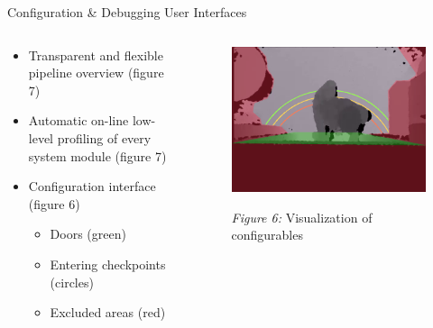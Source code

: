 \documentclass[final,hyperref={pdfpagelabels=false}]{beamer}
\begin{document}
\begin{frame}[t]
\begin{columns}[t]
\begin{column}{.465\textwidth}

\begin{block}{
\vspace*{-0.002\textheight}
Configuration \& Debugging User Interfaces
}

\begin{columns} %
\begin{column}{.54\textwidth} %

\begin{itemize}
\item Transparent and flexible pipeline overview (figure 7)
\item Automatic on-line low-level profiling of every system module (figure 7)
\item Configuration interface (figure 6)

\begin{itemize}
\item Doors (green)
\item Entering checkpoints (circles)
\item Excluded areas (red)
\end{itemize}
\end{itemize}

\end{column}

\begin{column}{.43\textwidth} %
\centering
\begin{figure}
\includegraphics[width=0.985\linewidth]{PosterConfigCrop.png}
\label{fig:Config}
\caption{\textit{Figure 6:} Visualization of configurables}
\end{figure}
\end{column}
\end{columns} %


\end{block}
\end{column}
\end{columns}
\end{frame}
\end{document}
